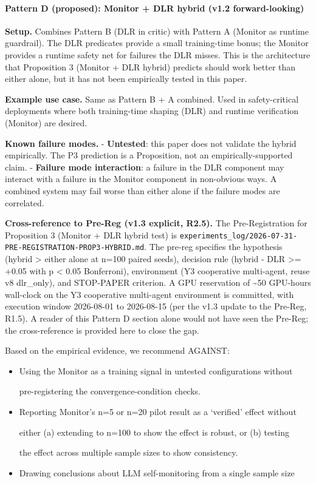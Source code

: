 \documentclass[
]{article}
\begin{document}
\paragraph{Pattern D (proposed): Monitor + DLR hybrid (v1.2
forward-looking)}\label{pattern-d-proposed-monitor-dlr-hybrid-v1.2-forward-looking}

\textbf{Setup.} Combines Pattern B (DLR in critic) with Pattern A
(Monitor as runtime guardrail). The DLR predicates provide a small
training-time bonus; the Monitor provides a runtime safety net for
failures the DLR misses. This is the architecture that Proposition 3
(Monitor + DLR hybrid) predicts should work better than either alone,
but it has not been empirically tested in this paper.

\textbf{Example use case.} Same as Pattern B + A combined. Used in
safety-critical deployments where both training-time shaping (DLR) and
runtime verification (Monitor) are desired.

\textbf{Known failure modes.} - \textbf{Untested}: this paper does not
validate the hybrid empirically. The P3 prediction is a Proposition, not
an empirically-supported claim. - \textbf{Failure mode interaction}: a
failure in the DLR component may interact with a failure in the Monitor
component in non-obvious ways. A combined system may fail worse than
either alone if the failure modes are correlated.

\textbf{Cross-reference to Pre-Reg (v1.3 explicit, R2.5).} The
Pre-Registration for Proposition 3 (Monitor + DLR hybrid test) is
\texttt{experiments\_log/2026-07-31-PRE-REGISTRATION-PROP3-HYBRID.md}.
The pre-reg specifies the hypothesis (hybrid \textgreater{} either alone
at n=100 paired seeds), decision rule (hybrid - DLR \textgreater= +0.05
with p \textless{} 0.05 Bonferroni), environment (Y3 cooperative
multi-agent, reuse v8 dlr\_only), and STOP-PAPER criterion. A GPU
reservation of \textasciitilde50 GPU-hours wall-clock on the Y3
cooperative multi-agent environment is committed, with execution window
2026-08-01 to 2026-08-15 (per the v1.3 update to the Pre-Reg, R1.5). A
reader of this Pattern D section alone would not have seen the Pre-Reg;
the cross-reference is provided here to close the gap.

Based on the empirical evidence, we recommend AGAINST:

\begin{itemize}
\item
  Using the Monitor as a training signal in untested configurations
  without

  pre-registering the convergence-condition checks.
\item
  Reporting Monitor's n=5 or n=20 pilot result as a `verified' effect
  without

  either (a) extending to n=100 to show the effect is robust, or (b)
  testing

  the effect across multiple sample sizes to show consistency.
\item
  Drawing conclusions about LLM self-monitoring from a single sample
  size
\end{itemize}
\end{document}
